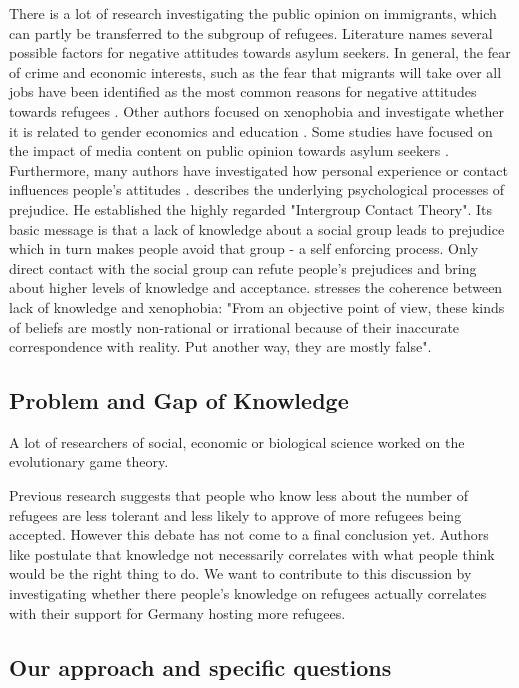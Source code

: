 There is a lot of research investigating the public opinion on immigrants, which can partly be transferred to the subgroup of refugees. Literature names several possible factors for negative attitudes towards asylum seekers. In general, the fear of crime and economic interests, such as the fear that migrants will take over all jobs have been identified as the most common reasons for negative attitudes towards refugees \citep{Otto2014}. Other authors focused on xenophobia and investigate whether it is related to gender \citep{Jolly2014} economics and education \citep{Francois2013}. Some studies have focused on the impact of media content on public opinion towards asylum seekers \citep{Boomgaarden2009, Perry1990, Brosius1995}. Furthermore, many authors have investigated how personal experience or contact influences people's attitudes \citep{Pettigrew1997}. \cite{Pettigrew1998} describes the underlying psychological processes of prejudice. He established the highly regarded "Intergroup Contact Theory". Its basic message is that a lack of knowledge about a social group leads to prejudice which in turn makes people avoid that group - a self enforcing process. Only direct contact with the social group can refute people's prejudices and bring about higher levels of knowledge and acceptance. \cite{Rydgren2004} stresses the coherence between lack of knowledge and xenophobia: "From an objective point of view, these kinds of beliefs are mostly non-rational or irrational because of their inaccurate correspondence with reality. Put another way, they are mostly false".

\subsection{Problem and Gap of Knowledge}
A lot of researchers of social, economic or biological science worked on the evolutionary game theory. 

Previous research suggests that people who know less about the number of refugees are less tolerant and less likely to approve of more refugees being accepted. However this debate has not come to a final conclusion yet. Authors like \cite{Kahan2014} postulate that knowledge not necessarily correlates with what people think would be the right thing to do. We want to contribute to this discussion by investigating whether there people’s knowledge on refugees actually correlates with their support for Germany hosting more refugees.


\subsection{Our approach and specific questions}

